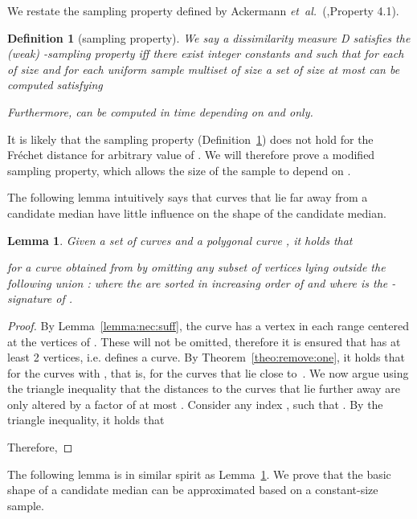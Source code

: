 \documentclass[11pt, letter]{article}
\newcommand{\etal}{\textit{e{}t~a{}l.}\xspace}
\newtheorem{definition}[theorem]{Definition}
\newtheorem{lemma}[theorem]{Lemma}
\newcommand{\thmref}[1]{Theorem~\ref{theo:#1}}
\newcommand{\lemlab}[1]{\label{lemma:#1}}
\newcommand{\lemref}[1]{Lemma~\ref{lemma:#1}}
\newcommand{\deflab}[1]{\label{def:#1}}
\newcommand{\defref}[1]{Definition~\ref{def:#1}}
\newcommand{\Frechet}{Fr\'echet\xspace}
\begin{document}
We restate the sampling property defined by Ackermann \etal~(\cite{abs-cm-10},Property 4.1).

\begin{definition}[sampling property]
\deflab{sampling:property}
We say a dissimilarity measure D satisfies the (weak)
-sampling property iff there exist integer constants
 and  such that for each 
of size  and for each uniform sample multiset  of size  a set 
 of size at most  can be computed satisfying

Furthermore,  can be computed in time depending on  and  only.
\end{definition} 

It is likely that the sampling property
(\defref{sampling:property}) does not hold for the \Frechet distance for
arbitrary value of . We will therefore prove a modified sampling
property, which allows the size of the sample to depend on .

The following lemma intuitively says that curves that lie far away from a candidate median 
have little influence on the shape of the candidate median.

\begin{lemma}\lemlab{omit:far:away}
Given a set of  curves  and a polygonal curve , it holds that 
 
for a curve  obtained from  by omitting any subset of vertices lying outside 
the following union :
where the  are sorted in increasing order of  and where
 is the -signature of . \end{lemma}

\begin{proof}
By \lemref{nec:suff}, the curve  has a vertex in each range centered at the vertices 
of 
. These will not be omitted, therefore it is ensured that
 has at least 2 vertices, i.e. defines a curve.
By  \thmref{remove:one},  it holds that
 for the curves 
with , that is, for the curves that lie close
to~.
We now argue using the triangle inequality that the distances to the curves
that lie further away are only altered by a factor of at most .
Consider any index , such that .
By the triangle inequality, it holds that 




Therefore,


\end{proof}

The following lemma is in similar spirit as \lemref{omit:far:away}. We prove that the
basic shape of a candidate median can be approximated based on a constant-size
sample.
\end{document}
